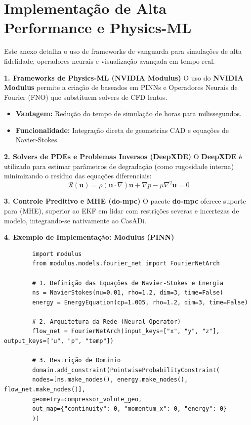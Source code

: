 \documentclass[12pt,a4paper]{article}
\numberwithin{equation}{section}
\numberwithin{table}{section}
\numberwithin{figure}{section}
\begin{document}
	\newpage
	
	\section{Implementação de Alta Performance e Physics-ML}
	
	Este anexo detalha o uso de frameworks de vanguarda para simulações de alta fidelidade, operadores neurais e visualização avançada em tempo real.
	
	\textbf{1. Frameworks de Physics-ML (NVIDIA Modulus)}
	O uso do \textbf{NVIDIA Modulus} permite a criação de  baseados em PINNs e Operadores Neurais de Fourier (FNO) que substituem solvers de CFD lentos.
	\begin{itemize}
		\item \textbf{Vantagem:} Redução do tempo de simulação de horas para milissegundos.
		\item \textbf{Funcionalidade:} Integração direta de geometrias CAD e equações de Navier-Stokes.
	\end{itemize}
	
	\textbf{2. Solvers de PDEs e Problemas Inversos (DeepXDE)}
	O \textbf{DeepXDE} é utilizado para estimar parâmetros de degradação (como rugosidade interna) minimizando o resíduo das equações diferenciais:
	\begin{equation}\label{eq:s27-1}
 \mathcal{R}(\mathbf{u}) = \rho (\mathbf{u} \cdotp \nabla) \mathbf{u} + \nabla p - \mu \nabla^2 \mathbf{u} = 0 
\end{equation}
	
	\textbf{3. Controle Preditivo e MHE (do-mpc)}
	O pacote \textbf{do-mpc} oferece suporte para  (MHE), superior ao EKF em lidar com restrições severas e incertezas de modelo, integrando-se nativamente ao CasADi.
	
	\textbf{4. Exemplo de Implementação: Modulus (PINN)}
	\begin{verbatim}
		import modulus
		from modulus.models.fourier_net import FourierNetArch
		
		# 1. Definição das Equações de Navier-Stokes e Energia
		ns = NavierStokes(nu=0.01, rho=1.2, dim=3, time=False)
		energy = EnergyEquation(cp=1.005, rho=1.2, dim=3, time=False)
		
		# 2. Arquitetura da Rede (Neural Operator)
		flow_net = FourierNetArch(input_keys=["x", "y", "z"], output_keys=["u", "p", "temp"])
		
		# 3. Restrição de Domínio
		domain.add_constraint(PointwiseProbabilityConstraint(
		nodes=[ns.make_nodes(), energy.make_nodes(), flow_net.make_nodes()],
		geometry=compressor_volute_geo,
		out_map={"continuity": 0, "momentum_x": 0, "energy": 0}
		))
	\end{verbatim}
	
\end{document}

